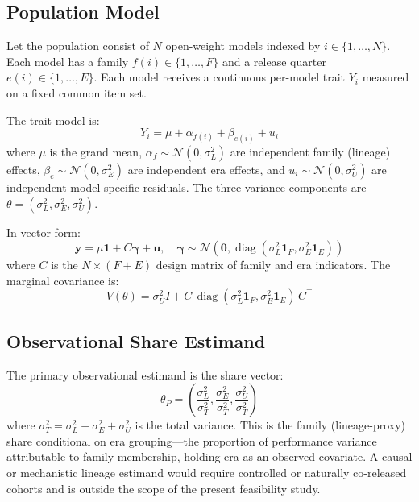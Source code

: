 \documentclass{ieeeaccess}
\theoremstyle{definition}
\theoremstyle{plain}
\begin{document}
\subsection{Population Model}
Let the population consist of $N$ open-weight models indexed by $i \in \{1, \ldots, N\}$. Each model has a family $f(i) \in \{1, \ldots, F\}$ and a release quarter $e(i) \in \{1, \ldots, E\}$. Each model receives a continuous per-model trait $Y_i$ measured on a fixed common item set.

The trait model is:
\begin{equation}
Y_i = \mu + \alpha_{f(i)} + \beta_{e(i)} + u_i
\label{eq:model}
\end{equation}
where $\mu$ is the grand mean, $\alpha_f \sim \mathcal{N}(0, \sigma^2_L)$ are independent family (lineage) effects, $\beta_e \sim \mathcal{N}(0, \sigma^2_E)$ are independent era effects, and $u_i \sim \mathcal{N}(0, \sigma^2_U)$ are independent model-specific residuals. The three variance components are $\theta = (\sigma^2_L, \sigma^2_E, \sigma^2_U)$.

In vector form:
\begin{equation}
\mathbf{y} = \mu \mathbf{1} + C \boldsymbol{\gamma} + \mathbf{u}, \quad \boldsymbol{\gamma} \sim \mathcal{N}(\mathbf{0}, \operatorname{diag}(\sigma^2_L \mathbf{1}_F, \sigma^2_E \mathbf{1}_E))
\label{eq:vector}
\end{equation}
where $C$ is the $N \times (F + E)$ design matrix of family and era indicators. The marginal covariance is:
\begin{equation}
V(\theta) = \sigma^2_U I + C \, \operatorname{diag}(\sigma^2_L \mathbf{1}_F, \sigma^2_E \mathbf{1}_E) \, C^\top
\label{eq:cov}
\end{equation}

\subsection{Observational Share Estimand}
The primary observational estimand is the share vector:
\begin{equation}
\theta_P = \left( \frac{\sigma^2_L}{\sigma^2_T}, \frac{\sigma^2_E}{\sigma^2_T}, \frac{\sigma^2_U}{\sigma^2_T} \right)
\label{eq:thetaP}
\end{equation}
where $\sigma^2_T = \sigma^2_L + \sigma^2_E + \sigma^2_U$ is the total variance. This is the family (lineage-proxy) share conditional on era grouping---the proportion of performance variance attributable to family membership, holding era as an observed covariate. A causal or mechanistic lineage estimand would require controlled or naturally co-released cohorts and is outside the scope of the present feasibility study.
\end{document}
